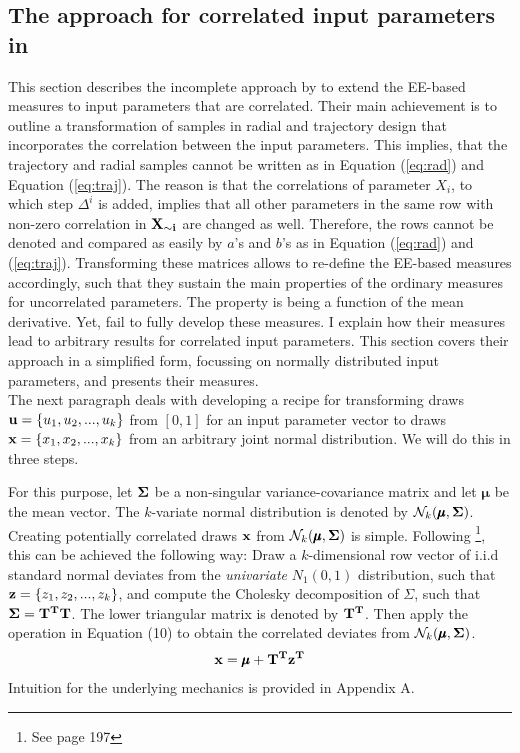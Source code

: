 \documentclass[a4paper,12pt]{article}
\begin{document}
\subsection{The approach for correlated input parameters in \cite{ge2017extending}}

This section describes the incomplete approach by \cite{ge2017extending} to extend the EE-based measures to input parameters that are correlated. Their main achievement is to outline a transformation of samples in radial and trajectory design that incorporates the correlation between the input parameters. This implies, that the trajectory and radial samples cannot be written as in Equation (\ref{eq:rad}) and Equation (\ref{eq:traj}). The reason is that the correlations of parameter $X_i$, to which step $\Delta^i$ is added, implies that all other parameters in the same row with non-zero correlation in $\bold{X_{\sim i}}$ are changed as well. Therefore, the rows cannot be denoted and compared as easily by $a$'s and $b$'s as in Equation (\ref{eq:rad}) and (\ref{eq:traj}). Transforming these matrices allows to re-define the EE-based measures accordingly, such that they sustain the main properties of the ordinary measures for uncorrelated parameters. The property is being a function of the mean derivative. Yet, \cite{ge2017extending} fail to fully develop these measures. I explain how their measures lead to arbitrary results for correlated input parameters. This section covers their approach in a simplified form, focussing on normally distributed input parameters, and presents their measures.\\

\noindent
The next paragraph deals with developing a recipe for transforming draws $\bold{u} = \{u_1, u_2, ..., u_k\}$ from $[0,1]$ for an input parameter vector to draws $\bold{x} = \{x_1, x_2, ..., x_k\}$ from an arbitrary joint normal distribution. We will do this in three steps. 

For this purpose, let $\bold{\Sigma}$ be a non-singular variance-covariance matrix and let $\pmb{\mu}$ be the mean vector. The $k$-variate normal distribution is denoted by $\mathcal{N}_k(\pmb{\mu}, \bold{\Sigma})$. \\

\noindent
Creating potentially correlated draws $\bold{x}$ from $\mathcal{N}_k(\pmb{\mu}, \bold{\Sigma})$ is simple. Following \cite{gentle2006random}\footnote{See page 197}, this can be achieved the following way: Draw a $k$-dimensional row vector of i.i.d standard normal deviates from the \textit{univariate} $N_1(0,1)$ distribution, such that  $\bold{z} = \{z_1, z_2, ..., z_k\}$, and compute the Cholesky decomposition of $\Sigma$, such that $\bold{\Sigma} = \bold{T^T T}$. The lower triangular matrix is denoted by $\bold{T^T}$. Then apply the operation in Equation (10) to obtain the correlated deviates from $\mathcal{N}_k(\pmb{\mu}, \bold{\Sigma})$.
\begin{align}
\bold{x} = \pmb{\mu} + \bold{T^T z^T} 
\end{align}
Intuition for the underlying mechanics is provided in Appendix A. \\
\end{document}
